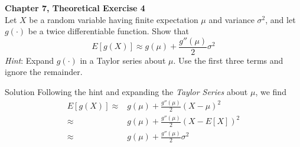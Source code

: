 \documentclass{article}
\begin{document}
\begin{spacing}{1.1}
\newpage
\begin{homeworkProblem}
  {\bf Chapter 7, Theoretical Exercise 4}\\
  Let $X$ be a random variable having finite expectation $\mu$ and 
  variance $\sigma^2$, and let $g(\cdot)$ be a twice differentiable function. 
  Show that
  \[E[ g( X)] \approx g( \mu) + \frac{ g''(\mu)}{ 2} \sigma^2\]
  \emph{Hint}: Expand $g(\cdot)$ in a Taylor series about $\mu$. Use the 
  first three terms and ignore the remainder.
  \begin{homeworkSection}{Solution}
    Following the hint and expanding the \emph{Taylor Series} about $\mu$, we find
    \begin{align*}
      E[g(X)]
      \approx & g(\mu) + \frac{ g''(\mu)}{ 2} (X - \mu)^2\\
      \approx & g(\mu) + \frac{ g''(\mu)}{ 2} (X - E[X])^2\\
      \approx & g(\mu) + \frac{ g''(\mu)}{ 2} \sigma^2\\
    \end{align*}
    
  \end{homeworkSection}
\end{homeworkProblem}
  
\end{spacing}
\end{document}
